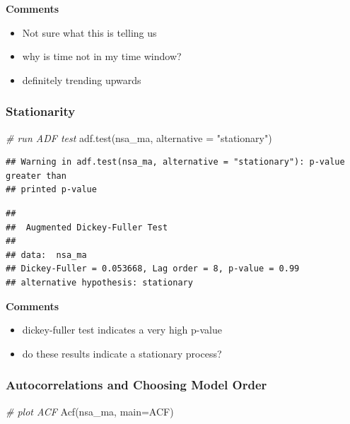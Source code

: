 \documentclass[
]{article}
\newenvironment{Shaded}{\begin{snugshade}}{\end{snugshade}}
\newcommand{\AttributeTok}[1]{\textcolor[rgb]{0.77,0.63,0.00}{#1}}
\newcommand{\CommentTok}[1]{\textcolor[rgb]{0.56,0.35,0.01}{\textit{#1}}}
\newcommand{\FunctionTok}[1]{\textcolor[rgb]{0.00,0.00,0.00}{#1}}
\newcommand{\NormalTok}[1]{#1}
\newcommand{\StringTok}[1]{\textcolor[rgb]{0.31,0.60,0.02}{#1}}
\providecommand{\tightlist}{%
  \setlength{\itemsep}{0pt}\setlength{\parskip}{0pt}}
\begin{document}
\textbf{Comments}

\begin{itemize}
\tightlist
\item
  Not sure what this is telling us
\item
  why is time not in my time window?
\item
  definitely trending upwards
\end{itemize}

\hypertarget{stationarity}{%
\subsubsection{Stationarity}\label{stationarity}}

\begin{Shaded}
\begin{Highlighting}[]
\CommentTok{\# run ADF test}
\FunctionTok{adf.test}\NormalTok{(nsa\_ma, }\AttributeTok{alternative =} \StringTok{"stationary"}\NormalTok{)}
\end{Highlighting}
\end{Shaded}

\begin{verbatim}
## Warning in adf.test(nsa_ma, alternative = "stationary"): p-value greater than
## printed p-value
\end{verbatim}

\begin{verbatim}
## 
##  Augmented Dickey-Fuller Test
## 
## data:  nsa_ma
## Dickey-Fuller = 0.053668, Lag order = 8, p-value = 0.99
## alternative hypothesis: stationary
\end{verbatim}

\textbf{Comments}

\begin{itemize}
\tightlist
\item
  dickey-fuller test indicates a very high p-value
\item
  do these results indicate a stationary process?
\end{itemize}

\hypertarget{autocorrelations-and-choosing-model-order}{%
\subsubsection{Autocorrelations and Choosing Model
Order}\label{autocorrelations-and-choosing-model-order}}

\begin{Shaded}
\begin{Highlighting}[]
\CommentTok{\# plot ACF}
\FunctionTok{Acf}\NormalTok{(nsa\_ma, }\AttributeTok{main=}\StringTok{\textquotesingle{}ACF\textquotesingle{}}\NormalTok{)}
\end{Highlighting}
\end{Shaded}
\end{document}
